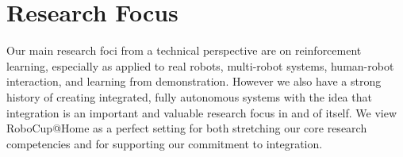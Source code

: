 \section{Research Focus}

Our main research foci from a technical perspective are on reinforcement learning, especially as applied to real robots, multi-robot systems, human-robot interaction, and learning from demonstration. However we also have a strong history of creating integrated, fully autonomous systems with the idea that integration is an important and valuable research focus in and of itself.  We view RoboCup@Home as a perfect setting for both stretching our core research competencies and for supporting our commitment to integration.

